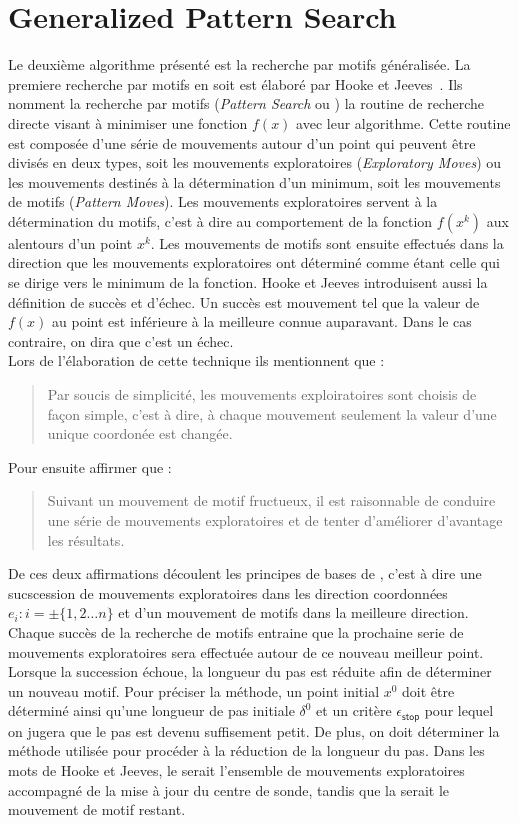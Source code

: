 \section{Generalized Pattern Search}\label{sec:gps}
Le deuxième algorithme présenté est la recherche par motifs généralisée. La premiere recherche par motifs en soit est élaboré par Hooke et Jeeves~\cite{HoJe61a}. Ils nomment la recherche par motifs (\emph{Pattern Search} ou \PS) la routine de recherche directe visant à minimiser une fonction $f(x)$ avec leur algorithme. Cette routine est composée d'une série de mouvements autour d'un point qui peuvent être divisés en deux types, soit les mouvements exploratoires (\emph{Exploratory Moves}) ou les mouvements destinés à la détermination d'un minimum, soit les mouvements de motifs (\emph{Pattern Moves}). Les mouvements exploratoires  servent à la détermination du motifs, c'est à dire au comportement de la fonction $f(x^k)$ aux alentours d'un point $x^k$. Les mouvements de motifs sont ensuite effectués dans la direction que les mouvements exploratoires ont déterminé comme étant celle qui se dirige vers le minimum de la fonction. Hooke et Jeeves introduisent aussi la définition de succès et d'échec. Un succès est mouvement tel que la valeur de $f(x)$ au point est inférieure à la meilleure connue auparavant. Dans le cas contraire, on dira que c'est un échec.\\
Lors de l'élaboration de cette technique ils mentionnent que :
\begin{quote}
	Par soucis de simplicité, les mouvements exploiratoires sont choisis de façon simple, c'est à dire, à chaque mouvement seulement la valeur d'une unique coordonée est changée.
\end{quote}
Pour ensuite affirmer que : 
\begin{quote}
	Suivant un mouvement de motif fructueux, il est raisonnable de conduire une série de mouvements exploratoires et de tenter d'améliorer d'avantage les résultats.
\end{quote}
De ces deux affirmations découlent les principes de bases de \PS{}, c'est à dire une sucscession de mouvements exploratoires dans les direction coordonnées $e_i : i =\pm \{1,2\dots n\}$ et d'un mouvement de motifs dans la meilleure direction. Chaque succès de la recherche de motifs entraine que la prochaine serie de mouvements exploratoires sera effectuée autour de ce nouveau meilleur point. Lorsque la succession échoue, la longueur du pas est réduite afin de déterminer un nouveau motif. Pour préciser la méthode, un point initial $x^0$ doit être déterminé ainsi qu'une longueur de pas initiale $\delta^0$ et un critère $\epsilon_{\textsf{stop}}$ pour lequel on jugera que le pas est devenu suffisement petit. De plus, on doit déterminer la méthode utilisée pour procéder à la réduction de la longueur du pas. Dans les mots de Hooke et Jeeves, le \POLL{} serait l'ensemble de mouvements exploratoires accompagné de la mise à jour du centre de sonde, tandis que la \SEARCH{} serait le mouvement de motif restant.\\
